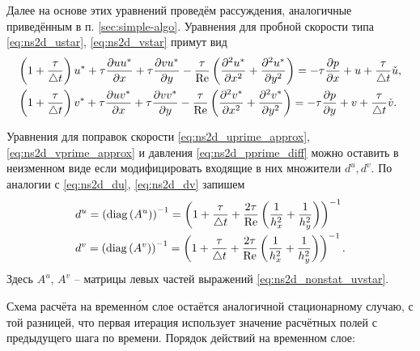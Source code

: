 Далее на основе этих уравнений проведём рассуждения, аналогичные приведённым в п. \ref{sec:simple-algo}.
Уравнения для пробной скорости типа \eqref{eq:ns2d_ustar}, \eqref{eq:ns2d_vstar}
примут вид
\begin{equation}
    \label{eq:ns2d_nonstat_uvstar}
    \begin{array}{l}
    \displaystyle
    \left(1 + \frac{\tau}{\triangle t}\right)u^* + \tau\frac{\partial u u^*}{\partial x} + \tau\frac{\partial v u^*}{\partial y}
       - \frac{\tau}{\mathrm{Re}}\left(\frac{\partial^2 u^*}{\partial x^2} + \frac{\partial^2 u^*}{\partial y^2}\right)
       = -\tau\frac{\partial p}{\partial x} + u + \frac\tau{\triangle t} \check u, \\[10pt]
    \displaystyle
    \left(1 + \frac{\tau}{\triangle t}\right)v^* + \tau\frac{\partial u v^*}{\partial x} + \tau\frac{\partial v v^*}{\partial y}
       - \frac{\tau}{\mathrm{Re}}\left(\frac{\partial^2 v^*}{\partial x^2} + \frac{\partial^2 v^*}{\partial y^2}\right)
       = -\tau\frac{\partial p}{\partial y} + v + \frac\tau{\triangle t} \check v.
   \end{array}
\end{equation}

Уравнения для поправок скорости \eqref{eq:ns2d_uprime_approx}, \eqref{eq:ns2d_vprime_approx}
и давления \eqref{eq:ns2d_pprime_diff}
можно оставить в неизменном виде если модифицировать входящие в них множители $d^u, d^v$.
По аналогии с \eqref{eq:ns2d_du}, \eqref{eq:ns2d_dv} запишем
\begin{equation}
    \label{eq:ns2d_nonstat_duv}
    \begin{array}{l}
    \displaystyle
    d^u = \left({\rm diag}\left(A^u\right)\right)^{-1} = 
        \left(1 + \frac\tau{\triangle t} + \frac{2\tau}{\mathrm{Re}}\left(\frac{1}{h_x^2} + \frac{1}{h_y^2}\right)\right)^{-1} \\[10pt]
    \displaystyle
    d^v = \left({\rm diag}\left(A^v\right) \right)^{-1}= 
        \left(1 + \frac\tau{\triangle t} + \frac{2\tau}{\mathrm{Re}}\left(\frac{1}{h_x^2} + \frac{1}{h_y^2}\right)\right)^{-1}.
    \end{array}
\end{equation}
Здесь $A^u$, $A^v$ -- матрицы левых частей выражений \eqref{eq:ns2d_nonstat_uvstar}.

Схема расчёта на временн\'{о}м слое остаётся аналогичной стационарному случаю,
с той разницей, что первая итерация использует значение расчётных полей
с предыдущего шага по времени.
Порядок действий на временном слое:

